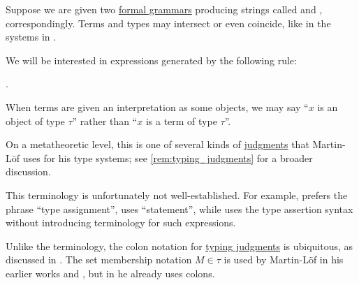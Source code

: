 \begin{definition}\label{def:type_assertion}\mimprovised
  Suppose we are given two \hyperref[def:formal_grammar/schema]{formal grammars} producing strings called  and , correspondingly. Terms and types may intersect or even coincide, like in the systems in .

  We will be interested in expressions generated by the following rule:
  \begin{bnf*}
     { \bnfsp \bnftsq{\( : \)} \bnfsp {}}.
  \end{bnf*}
\end{definition}
\begin{comments}
  \item When terms are given an interpretation as some objects, we may say \enquote{\( x \) is an object of type \( \tau \)} rather than \enquote{\( x \) is a term of type \( \tau \)}.

  \item On a metatheoretic level, this is one of several kinds of \hyperref[con:judgment]{judgments} that Martin-L\"of uses for his type systems; see \cref{rem:typing_judgments} for a broader discussion.

  \item This terminology is unfortunately not well-established. For example,  prefers the phrase \enquote{type assignment},  uses \enquote{statement}, while  uses the type assertion syntax without introducing terminology for such expressions.

  \item Unlike the terminology, the colon notation for \hyperref[rem:typing_judgments]{typing judgments} is ubiquitous, as discussed in \cite{MathSE:origin_of_colon_notation_for_type_assertions}. The set membership notation \( M \in \tau \) is used by Martin-L\"of in his earlier works \cite{MartinLöf1975IntuitionisticTypeTheory} and \cite{MartinLöf1984IntuitionisticTypeTheory}, but in \cite{MartinLöf1994TypeJudgments} he already uses colons.
\end{comments}

